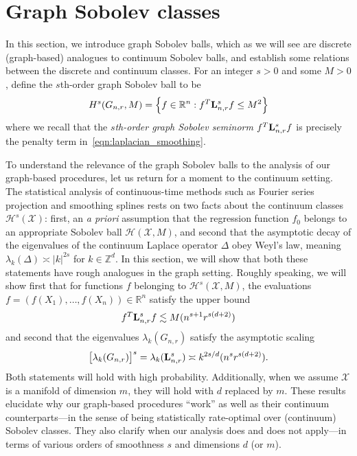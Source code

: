 \documentclass{article}
\newcommand{\Reals}{\mathbb{R}}
\newcommand{\abs}[1]{\left \lvert #1 \right \rvert}
\newcommand{\1}{\mathbf{1}}
\newcommand{\Lap}{{\bf L}}
\newcommand{\Xset}{\mathcal{X}}
\newcommand{\mc}[1]{\mathcal{#1}}
\theoremstyle{alden}
\theoremstyle{aldenthm}
\theoremstyle{definition}
\theoremstyle{remark}
\begin{document}
\section{Graph Sobolev classes}
\label{sec:graph_sobolev_classes}
In this section, we introduce graph Sobolev balls, which as we will see are discrete (graph-based) analogues to continuum Sobolev balls, and establish some relations between the discrete and continuum classes. For an integer $s > 0$ and some $M > 0$, define the $s$th-order graph Sobolev ball to be
\begin{equation}
\label{eqn:graph_sobolev_ball}
H^s(G_{n,r},M) = \Bigl\{f \in \Reals^n: f^T \Lap_{n,r}^s f \leq M^2\Bigr\}
\end{equation}
where we recall that the \emph{$s$th-order graph Sobolev seminorm} $f^T \Lap_{{n,r}}^s f$ is precisely the penalty term in~\eqref{eqn:laplacian_smoothing}. 

To understand the relevance of the graph Sobolev balls to the analysis of our graph-based procedures, let us return for a moment to the continuum setting. The statistical analysis of continuous-time methods such as Fourier series projection and smoothing splines rests on two facts about the continuum classes $\mc{H}^s(\Xset)$: first, an \textit{a priori} assumption that the regression function $f_0$ belongs to an appropriate Sobolev ball $\mc{H}(\Xset,M)$, and second that the asymptotic decay of the eigenvalues of the continuum Laplace operator $\Delta$ obey Weyl's law, meaning $\lambda_k(\Delta) \asymp \abs{k}^{2s}$ for $k \in \mathbb{Z}^d$. In this section, we will show that both these statements have rough analogues in the graph setting. Roughly speaking, we will show first that for functions $f$ belonging to $\mc{H}^s(\Xset, M)$, the evaluations $f = (f(X_1),\ldots,f(X_n)) \in \Reals^n$ satisfy the upper bound
\begin{equation}
\label{eqn:graph_sobolev_seminorm_asymptotic}
f^T \Lap_{n,r}^s f \lesssim M(n^{s + 1}r^{s(d + 2)})
\end{equation}
and second that the eigenvalues $\lambda_k(G_{n,r})$ satisfy the asymptotic scaling
\begin{equation}
\label{eqn:neighborhood_graph_eigenvalue_asymptotic}
\bigl[\lambda_k(G_{n,r})\bigr]^s = \lambda_k(\Lap_{{n,r}}^s) \asymp k^{2s/d} (n^s r^{s(d + 2)}).
\end{equation}
Both statements will hold with high probability. Additionally, when we assume $\Xset$ is a manifold of dimension $m$, they will hold with $d$ replaced by $m$. These results elucidate why our graph-based procedures ``work'' as well as their continuum counterparts---in the sense of being statistically rate-optimal over (continuum) Sobolev classes. They also clarify when our analysis does and does not apply---in terms of various orders of smoothness $s$ and dimensions $d$ (or $m$).
\end{document}
